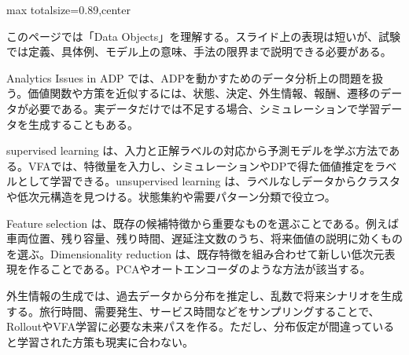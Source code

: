 \begin{minipage}[t]{0.58\textwidth}
\begin{adjustbox}{max totalsize={\textwidth}{0.89\textheight},center}
\begin{minipage}{\textwidth}\scriptsize
{}このページでは「Data Objects」を理解する。スライド上の表現は短いが、試験では定義、具体例、モデル上の意味、手法の限界まで説明できる必要がある。\par
Analytics Issues in ADP では、ADPを動かすためのデータ分析上の問題を扱う。価値関数や方策を近似するには、状態、決定、外生情報、報酬、遷移のデータが必要である。実データだけでは不足する場合、シミュレーションで学習データを生成することもある。\par
supervised learning は、入力と正解ラベルの対応から予測モデルを学ぶ方法である。VFAでは、特徴量を入力し、シミュレーションやDPで得た価値推定をラベルとして学習できる。unsupervised learning は、ラベルなしデータからクラスタや低次元構造を見つける。状態集約や需要パターン分類で役立つ。\par
Feature selection は、既存の候補特徴から重要なものを選ぶことである。例えば車両位置、残り容量、残り時間、遅延注文数のうち、将来価値の説明に効くものを選ぶ。Dimensionality reduction は、既存特徴を組み合わせて新しい低次元表現を作ることである。PCAやオートエンコーダのような方法が該当する。\par
外生情報の生成では、過去データから分布を推定し、乱数で将来シナリオを生成する。旅行時間、需要発生、サービス時間などをサンプリングすることで、RolloutやVFA学習に必要な未来パスを作る。ただし、分布仮定が間違っていると学習された方策も現実に合わない。\par

\end{minipage}
\end{adjustbox}
\end{minipage}
